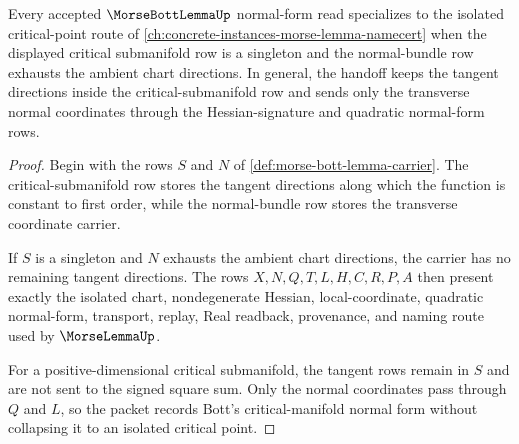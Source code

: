 \begin{theorem}
\label{thm:morse-bott-lemma-critical-manifold-handoff}
Every accepted $\MorseBottLemmaUp$ normal-form read specializes to the isolated critical-point route of \autoref{ch:concrete-instances-morse-lemma-namecert} when the displayed critical submanifold row is a singleton and the normal-bundle row exhausts the ambient chart directions. In general, the handoff keeps the tangent directions inside the critical-submanifold row and sends only the transverse normal coordinates through the Hessian-signature and quadratic normal-form rows.
\end{theorem}
\begin{proof}
Begin with the rows $S$ and $N$ of \autoref{def:morse-bott-lemma-carrier}. The critical-submanifold row stores the tangent directions along which the function is constant to first order, while the normal-bundle row stores the transverse coordinate carrier.

If $S$ is a singleton and $N$ exhausts the ambient chart directions, the carrier has no remaining tangent directions. The rows $X,N,Q,T,L,H,C,R,P,A$ then present exactly the isolated chart, nondegenerate Hessian, local-coordinate, quadratic normal-form, transport, replay, Real readback, provenance, and naming route used by $\MorseLemmaUp$.

For a positive-dimensional critical submanifold, the tangent rows remain in $S$ and are not sent to the signed square sum. Only the normal coordinates pass through $Q$ and $L$, so the packet records Bott's critical-manifold normal form without collapsing it to an isolated critical point.
\end{proof}



